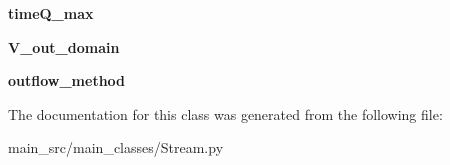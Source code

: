 \begin{DoxyCompactItemize}
\item 
\hypertarget{classmain__src_1_1main__classes_1_1Stream_1_1Reach_a0a39e269b3632802938ce667190698da}{{\bfseries time\-Q\-\_\-max}}\label{classmain__src_1_1main__classes_1_1Stream_1_1Reach_a0a39e269b3632802938ce667190698da}

\item 
\hypertarget{classmain__src_1_1main__classes_1_1Stream_1_1Reach_ac24abe825590d3ea04835a14cd85e4b1}{{\bfseries V\-\_\-out\-\_\-domain}}\label{classmain__src_1_1main__classes_1_1Stream_1_1Reach_ac24abe825590d3ea04835a14cd85e4b1}

\item 
\hypertarget{classmain__src_1_1main__classes_1_1Stream_1_1Reach_af13820c0136c1fa1ce694324eb5186f6}{{\bfseries outflow\-\_\-method}}\label{classmain__src_1_1main__classes_1_1Stream_1_1Reach_af13820c0136c1fa1ce694324eb5186f6}

\end{DoxyCompactItemize}


The documentation for this class was generated from the following file\-:\begin{DoxyCompactItemize}
\item 
main\-\_\-src/main\-\_\-classes/Stream.\-py\end{DoxyCompactItemize}
